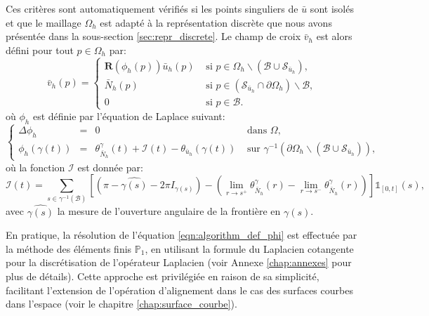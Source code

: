 Ces critères sont automatiquement vérifiés si les points singuliers de $\bar{u}$ sont isolés et que le maillage $\Omega_h$ est adapté à la représentation discrète que nous avons présentée dans la sous-section \ref{sec:repr_discrete}. Le champ de croix $\bar{v}_h$ est alors défini pour tout $p\in\Omega_h$ par:
\begin{equation}
\bar{v}_h(p)=
\left\{
\begin{array}{ll}
\mathbf{R}(\phi_h(p))\bar{u}_h(p) & \mbox{ si } p\in\Omega_h\backslash(\mathcal{B}\cup\mathcal{S}_{\bar{u}_h}),\\[0.5cm]
\bar{N}_h(p) & \mbox{ si } p\in(\mathcal{S}_{\bar{u}_h}\cap\partial\Omega_h)\backslash\mathcal{B},\\[0.5cm]
0 & \mbox{ si } p\in\mathcal{B}.
\end{array}
\right.
\label{eqn:etude_def_v_second}
\end{equation}
où $\phi_h$ est définie par l'équation de Laplace suivant:
\begin{equation}
\left\{
\begin{array}{lcll}
\Delta\phi_h &=& 0 &\mbox{ dans }\Omega,\\[0.5cm]
\phi_h(\gamma(t))&=&\theta_{\bar{N}_h}^\gamma(t)+\mathcal{I}(t)-\theta_{\bar{u}_h}(\gamma(t))& \mbox{ sur } \gamma^{-1}(\partial\Omega_h\backslash(\mathcal{B}\cup\mathcal{S}_{\bar{u}_h})),
\end{array}
\right.
\label{eqn:algorithm_def_phi}
\end{equation}
où la fonction $\mathcal{I}$ est donnée par:
$$
\mathcal{I}(t)=\displaystyle\sum_{s\in\gamma^{-1}(\mathcal{B})}\left[\left(\pi-\widehat{\gamma(s)}-2\pi I_{\gamma(s)}\right)-\left(\displaystyle\lim\limits_{r\rightarrow s^+}\theta^{\gamma}_{\bar{N}_h}(r) - \lim\limits_{r\rightarrow s^-}\theta^{\gamma}_{\bar{N}_h}(r)\right)\right]\mathbb{1}_{[0, t]}(s),
$$
avec $\widehat{\gamma(s)}$ la mesure de l'ouverture angulaire de la frontière en $\gamma(s)$.

En pratique, la résolution de l'équation \eqref{eqn:algorithm_def_phi} est effectuée par la méthode des éléments finis $\mathbb{P}_1$, en utilisant la formule du Laplacien cotangente pour la discrétisation de l'opérateur Laplacien \cite{solomon2014laplace, nealen2006laplacian, belkin2008discrete} (voir Annexe \ref{chap:annexes} pour plus de détails). Cette approche est privilégiée en raison de sa simplicité, facilitant l'extension de l'opération d'alignement dans le cas des surfaces courbes dans l'espace (voir le chapitre \ref{chap:surface_courbe}).

